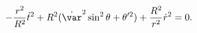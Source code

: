 \begin{equation}
-\frac{r^2}{R^2} \dot{t}^2 + R^2(\dot{\var}^2\sin^2\theta + \theta'^2 )
 + \frac{R^2}{r^2}\dot{r}^2 = 0.
\label{em}\end{equation}

